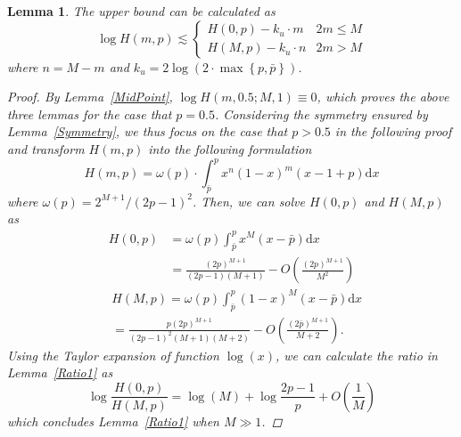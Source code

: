 \documentclass{article}
\newtheorem{lemma}[theorem]{Lemma}
\begin{document}
\begin{lemma}
\label{UpBound1}
The upper bound can be calculated as
\begin{equation*}
\log H(m,p)\lesssim \left\{
    \begin{array}{cl}
    H(0,p)- k_u\cdot m& 2m\leq M\\
    H(M,p)- k_u\cdot n& 2m>M
    \end{array}\right.
\end{equation*}
where $n=M-m$ and $k_u=2\log\left(2\cdot \max\left\{p,\bar{p}\right\}\right)$.
\begin{proof}
By Lemma~\ref{MidPoint}, $\log H(m, 0.5;M,1)\equiv 0$, which proves the above three lemmas for the case that $p=0.5$. Considering the symmetry ensured by Lemma~\ref{Symmetry}, we thus focus on the case that $p>0.5$ in the following proof and transform $H(m,p)$ into the following formulation
\begin{equation}
H(m,p)=\omega(p)\cdot \int_{\bar{p}}^{p}x^n(1-x)^m(x-1+p)\mathrm{d}x
\end{equation}
where $\omega(p)=2^{M+1}/(2p-1)^2$. Then, we can solve $H(0,p)$ and $H(M,p)$ as
\begin{equation}
\begin{split}
H(0,p)&=\omega(p)\int_{\bar{p}}^{p}x^M(x-\bar{p})\mathrm{d}x\\
&=\frac{(2p)^{M+1}}{(2p-1)(M+1)} - O\left(\frac{(2p)^{M+1}}{M^2}\right)
\end{split}
\end{equation}
\begin{equation}
\begin{split}
&H(M,p)=\omega(p)\int_{\bar{p}}^{p}(1-x)^M(x-\bar{p})\mathrm{d}x\\
&=\frac{p(2p)^{M+1}}{(2p-1)^2(M+1)(M+2)} - O\left(\frac{(2\bar{p})^{M+1}}{M+2}\right).
\end{split}
\end{equation}
Using the Taylor expansion of function $\log(x)$, we can calculate the ratio in Lemma~\ref{Ratio1} as
\begin{equation}
\log\frac{H(0,p)}{H(M,p)}=\log(M)+\log\frac{2p-1}{p}+O\left(\frac{1}{M}\right)
\end{equation}
which concludes Lemma~\ref{Ratio1} when $M\gg 1$.


\end{proof}
\end{lemma}
\end{document}
